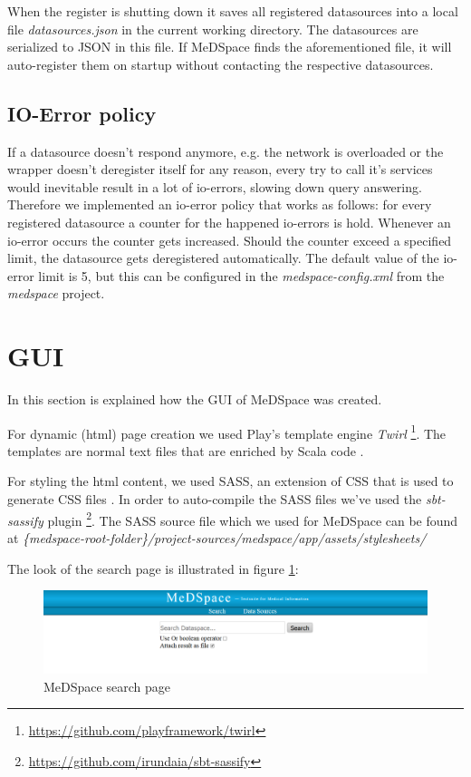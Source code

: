 When the register is shutting down it saves all registered datasources into a local file \emph{datasources.json} in the current working directory. The datasources are serialized to JSON in this file. If MeDSpace finds the aforementioned file, it will auto-register them on startup without contacting the respective datasources.

\subsection{IO-Error policy}

If a datasource doesn't respond anymore, e.g. the network is overloaded or the wrapper doesn't deregister itself for any reason, every try to call it's services would inevitable result in a lot of io-errors, slowing down query answering. Therefore we implemented an io-error policy that works as follows: for every registered datasource a counter for the happened io-errors is hold. Whenever an io-error occurs the counter gets increased. Should the counter exceed a specified limit, the datasource gets deregistered automatically. The default value of the io-error limit is 5, but this can be configured in the \emph{medspace-config.xml} from the \emph{medspace} project.

\section{GUI}
In this section is explained how the GUI of MeDSpace was created.

For dynamic (html) page creation we used Play's template engine \emph{Twirl} \footnote{\url{https://github.com/playframework/twirl}}. The templates are normal text files that are enriched by Scala code \cite{PlayJavaTemplates}.

For styling the html content, we used SASS, an extension of CSS that is used to generate CSS files \cite{SASS}. In order to auto-compile the SASS files we've used the \emph{sbt-sassify} plugin \footnote{\url{https://github.com/irundaia/sbt-sassify}}. The SASS source file which we used for MeDSpace can be found at \emph{\{medspace-root-folder\}/project-sources/medspace/app/assets/stylesheets/}

The look of the search page is illustrated in figure \ref{MeDSpaceSearchPage}:

\begin{figure}[H]
	\begin{center}
		\includegraphics[width=1\textwidth]{figures/MeDSpace-GUI-Search-Main.png}
	\end{center}
	\caption{MeDSpace search page}
	\label{MeDSpaceSearchPage}
\end{figure}


